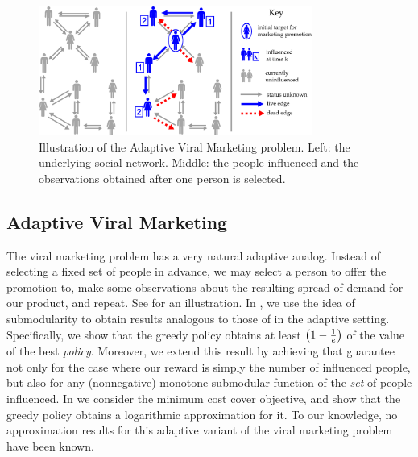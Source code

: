  \begin{figure} 
 \centering 
 \includegraphics[width=0.8\textwidth]{figs/viralMarketing}
 \caption{Illustration of the Adaptive Viral Marketing problem. Left:
   the underlying social network. 
   Middle: the people influenced and
   the observations obtained after one person is selected.}
 \label{fig:viralmarketing}
 \end{figure}


\subsection{Adaptive Viral Marketing} The viral marketing problem has a very natural adaptive analog. Instead of selecting a fixed set of people in advance, we may select a person to offer the promotion to, 
make some observations about the resulting spread of demand for our product, and repeat. See  for an illustration.
In , 
we use the idea of \term submodularity to 
obtain results analogous to
those of \citet{kempe03} in the adaptive setting. 
Specifically, we show that the greedy policy obtains at least $ \left( {1 - \frac1e} \right) $ of the value of
the best \emph{policy}.  Moreover, we extend this result by 
achieving that guarantee not only
for the case where our reward is simply the number of influenced
people, but also for any (nonnegative) monotone submodular function of the 
\emph{set} of people influenced.  In 
we consider the minimum cost
cover objective, and show that the greedy policy obtains a logarithmic
approximation for it. To our knowledge, no approximation results for this adaptive variant of the viral marketing problem have been known.




